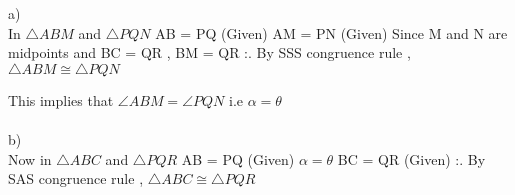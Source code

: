 \noindent a) \\
    In $\triangle ABM$  and  $\triangle PQN$ \newline 
    AB = PQ (Given)  \newline
    AM = PN (Given) \newline
    Since M and N are midpoints and BC = QR , \newline
    BM = QR  \newline
    :. By SSS congruence rule , $\triangle ABM \cong \triangle PQN$  \newline
    
        This implies that $\angle ABM = \angle PQN$ i.e $\alpha = \theta$
    \newline
    \\
    \\
b) \\   
Now in $\triangle ABC$  and  $\triangle PQR$ \newline 
AB = PQ (Given)  \newline
$\alpha = \theta$ \newline
BC = QR (Given)\newline
:. By SAS congruence rule , $\triangle ABC \cong \triangle PQR$ 
    


